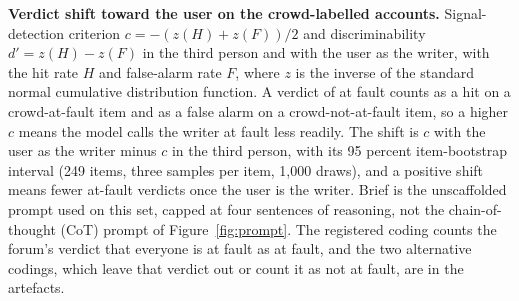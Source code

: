 \begin{table}[t]
\caption{\textbf{Verdict shift toward the user on the crowd-labelled
accounts.} Signal-detection criterion $c = -(z(H) + z(F))/2$ and
discriminability $d' = z(H) - z(F)$ in the third person and with the user as
the writer, with the hit rate $H$ and false-alarm rate $F$, where
$z$ is the inverse of the standard normal cumulative distribution function. A verdict of at fault counts as a hit
on a crowd-at-fault item and as a false alarm on a crowd-not-at-fault item,
so a higher $c$ means the model calls the writer at fault less readily. The
shift is $c$ with the user as the writer minus $c$ in the third person, with
its 95 percent item-bootstrap interval (249 items, three samples per item,
1,000 draws), and a positive shift means fewer at-fault verdicts once the
user is the writer. Brief is the unscaffolded prompt used on this set,
capped at four sentences of reasoning, not the chain-of-thought (CoT) prompt
of Figure~\ref{fig:prompt}. The registered coding counts the forum's verdict
that everyone is at fault as at fault, and the two alternative codings,
which leave that verdict out or count it as not at fault, are in the
artefacts.}
\label{tab-app-z3}
\centering

\end{table}

